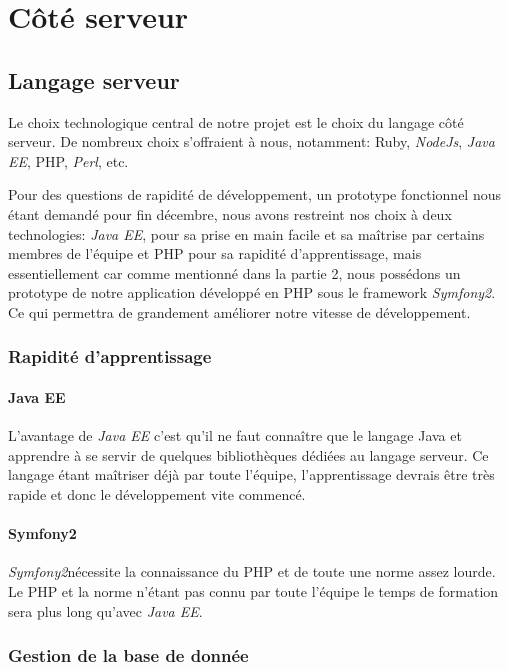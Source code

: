 \section{Côté serveur}

\subsection{Langage serveur}
Le choix technologique central de notre projet est le choix du langage côté serveur. De nombreux choix s'offraient à nous, notamment: Ruby, \textit{NodeJs}, \textit{Java EE}, PHP, \textit{Perl}, etc.

Pour des questions de rapidité de développement, un prototype fonctionnel nous étant demandé pour fin décembre, nous avons restreint nos choix à deux technologies: \textit{Java EE}, pour sa prise en main facile et sa maîtrise par certains membres de l'équipe et PHP pour sa rapidité d'apprentissage, mais essentiellement car comme mentionné dans la partie 2, nous possédons un prototype de notre application développé en PHP sous le framework \textit{Symfony2}. Ce qui permettra de grandement améliorer notre vitesse de développement.\\


\subsubsection{Rapidité d'apprentissage}
\paragraph{Java EE}
L'avantage de \textit{Java EE} c'est qu'il ne faut connaître que le langage Java et apprendre à se servir de quelques bibliothèques dédiées au langage serveur.
Ce langage étant maîtriser déjà par toute l'équipe, l'apprentissage devrais être très rapide et donc le développement vite commencé.

\paragraph{Symfony2}
\textit{Symfony2}nécessite la connaissance du PHP et de toute une norme assez lourde. 
Le PHP et la norme n'étant pas connu par toute l'équipe le temps de formation sera plus long qu'avec \textit{Java EE}.

\subsubsection{Gestion de la base de donnée}
